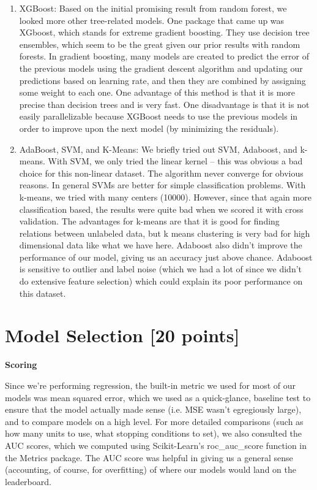 \begin{enumerate}
\item XGBoost: Based on the initial promising result from random forest, we looked more other tree-related models. One package that came up was XGboost, which stands for extreme gradient boosting. They use decision tree ensembles, which seem to be the great given our prior results with random forests. In gradient boosting, many models are created to predict the error of the previous models using the gradient descent algorithm and updating our predictions based on learning rate, and then they are combined by assigning some weight to each one. One advantage of this method is that it is more precise than decision trees and is very fast. One disadvantage is that it is not easily parallelizable because XGBoost needs to use the previous models in order to improve upon the next model (by minimizing the residuals).

\item AdaBoost, SVM, and K-Means: We briefly tried out SVM, Adaboost, and k-means. With SVM, we only tried the linear kernel -- this was obvious a bad choice for this non-linear dataset. The algorithm never converge for obvious reasons. In general SVMs are better for simple classification problems. With k-means, we tried with many centers (10000). However, since that again more classification based, the results were quite bad when we scored it with cross validation. The advantages for k-means are that it is good for finding relations between unlabeled data, but k means clustering is very bad for high dimensional data like what we have here. Adaboost also didn’t improve the performance of our model, giving us an accuracy just above chance. Adaboost is sensitive to outlier and label noise (which we had a lot of since we didn’t do extensive feature selection) which could explain its poor performance on this dataset.
\end{enumerate}

\newpage

\section{Model Selection [20 points]}

\vspace{2ex}

\noindent
\textbf{Scoring}

\noindent
Since we’re performing regression, the built-in metric we used for most of our models was mean squared error, which we used as a quick-glance, baseline test to ensure that the model actually made sense (i.e. MSE wasn’t egregiously large), and to compare models on a high level. For more detailed comparisons (such as how many units to use, what stopping conditions to set), we also consulted the AUC scores, which we computed using Scikit-Learn’s roc_auc_score function in the Metrics package. The AUC score was helpful in giving us a general sense (accounting, of course, for overfitting) of where our models would land on the leaderboard.


